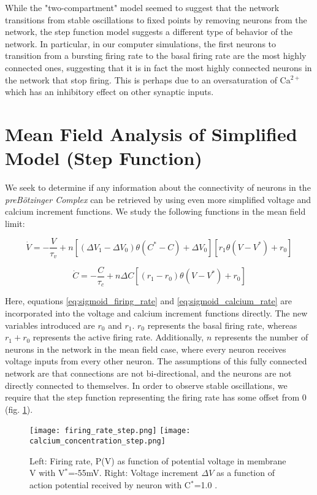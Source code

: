 \documentclass[11pt,letterpaper]{article}
\begin{document}
While the "two-compartment" model seemed to suggest that the network transitions from stable oscillations to fixed points by removing neurons from the network, the step function model suggests a different type of behavior of the network. In particular, in our computer simulations, the first neurons to transition from a bursting firing rate to the basal firing rate are the most highly connected ones, suggesting that it is in fact the most highly connected neurons in the network that stop firing. This is perhaps due to an oversaturation of Ca$^{2+}$ which has an inhibitory effect on other synaptic inputs.

\section{Mean Field Analysis of Simplified Model (Step Function)}
We seek to determine if any information about the connectivity of neurons in the \textit{preB{\"o}tzinger Complex} can be retrieved by using even more simplified voltage and calcium increment functions. We study the following functions in the mean field limit:

\begin{equation}
\label{eq:step_voltage_increment}
\dot{V} = -\frac{V}{\tau _v} + n [(\Delta V_1 - \Delta V_0) \theta (C^* - C) + \Delta V_0 ][r_1\theta (V - V^*) + r_0]
\end{equation}

\begin{equation}
\label{eq:step_calcium_increment}
\dot{C} = -\frac{C}{\tau _c} + n\Delta C [(r_1 - r_0) \theta (V - V^*) + r_0]
\end{equation}

Here, equations \ref{eq:sigmoid_firing_rate} and \ref{eq:sigmoid_calcium_rate} are incorporated into the voltage and calcium increment functions directly. The new variables introduced are $r_0$ and $r_1$. $r_0$ represents the basal firing rate, whereas $r_1 + r_0$ represents the active firing rate. Additionally, $n$ represents the number of neurons in the network in the mean field case, where every neuron receives voltage inputs from every other neuron. The assumptions of this fully connected network are that connections are not bi-directional, and the neurons are not directly connected to themselves. In order to observe stable oscillations, we require that the step function representing the firing rate has some offset from 0 (fig. \ref{fig:step_figures}).

\begin{figure}
	\centering
    	\texttt{[image: firing\_rate\_step.png]}
        \texttt{[image: calcium\_concentration\_step.png]}
    \caption{Left: Firing rate, P(V) as function of potential voltage in membrane V with V$^*$=-55mV. Right: Voltage increment $\Delta V$ as a function of action potential received by neuron with C$^*$=1.0 \cite{kcore_paper}.}
    \label{fig:step_figures}
\end{figure}
\end{document}
